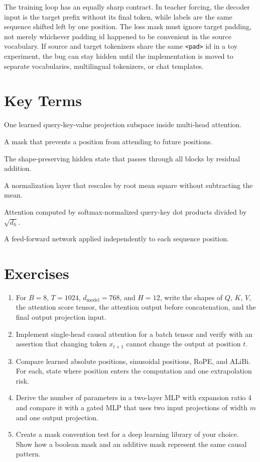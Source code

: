 The training loop has an equally sharp contract. In teacher forcing, the decoder input is the target prefix without its final token, while labels are the same sequence shifted left by one position. The loss mask must ignore target padding, not merely whichever padding id happened to be convenient in the source vocabulary. If source and target tokenizers share the same \texttt{<pad>} id in a toy experiment, the bug can stay hidden until the implementation is moved to separate vocabularies, multilingual tokenizers, or chat templates.

\section{Key Terms}
\label{sec:chapter-three-key-terms}

\begin{description}
\item[Attention head] One learned query-key-value projection subspace inside multi-head attention.
\item[Causal mask] A mask that prevents a position from attending to future positions.
\item[Residual stream] The shape-preserving hidden state that passes through all blocks by residual addition.
\item[RMSNorm] A normalization layer that rescales by root mean square without subtracting the mean.
\item[Scaled dot-product attention] Attention computed by softmax-normalized query-key dot products divided by $\sqrt{d_h}$.
\item[Tokenwise MLP] A feed-forward network applied independently to each sequence position.
\end{description}

\section{Exercises}
\label{sec:chapter-three-exercises}

\begin{enumerate}
\item For $B=8$, $T=1024$, $d_{\mathrm{model}}=768$, and $H=12$, write the shapes of $Q$, $K$, $V$, the attention score tensor, the attention output before concatenation, and the final output projection input.
\item Implement single-head causal attention for a batch tensor and verify with an assertion that changing token $x_{t+1}$ cannot change the output at position $t$.
\item Compare learned absolute positions, sinusoidal positions, RoPE, and ALiBi. For each, state where position enters the computation and one extrapolation risk.
\item Derive the number of parameters in a two-layer MLP with expansion ratio 4 and compare it with a gated MLP that uses two input projections of width $m$ and one output projection.
\item Create a mask convention test for a deep learning library of your choice. Show how a boolean mask and an additive mask represent the same causal pattern.
\end{enumerate}
